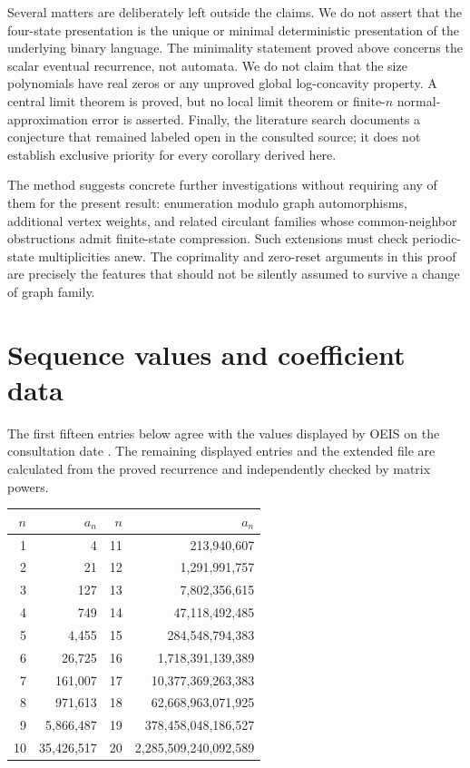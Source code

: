 \documentclass[11pt,a4paper]{article}
\theoremstyle{definition}
\begin{document}
Several matters are deliberately left outside the claims. We do not assert
that the four-state presentation is the unique or minimal deterministic
presentation of the underlying binary language. The minimality statement
proved above concerns the scalar eventual recurrence, not automata. We do
not claim that the size polynomials have real zeros or any unproved global
log-concavity property. A central limit theorem is proved, but no local limit
theorem or finite-$n$ normal-approximation error is asserted. Finally, the
literature search documents a conjecture that remained labeled open in the
consulted source; it does not establish exclusive priority for every
corollary derived here.

The method suggests concrete further investigations without requiring any
of them for the present result: enumeration modulo graph automorphisms,
additional vertex weights, and related circulant families whose
common-neighbor obstructions admit finite-state compression. Such extensions
must check periodic-state multiplicities anew. The coprimality and zero-reset
arguments in this proof are precisely the features that should not be
silently assumed to survive a change of graph family.

\appendix
\section{Sequence values and coefficient data}
\label{app:data}

The first fifteen entries below agree with the values displayed by OEIS on
the consultation date \cite{oeis}. The remaining displayed entries and the
extended file are calculated from the proved recurrence and independently
checked by matrix powers.
\begin{center}
\begin{tabular}{@{}rr@{\qquad}rr@{}}
\toprule
$n$ & $a_n$ & $n$ & $a_n$\\
\midrule
1 & 4 & 11 & 213,940,607 \\
2 & 21 & 12 & 1,291,991,757 \\
3 & 127 & 13 & 7,802,356,615 \\
4 & 749 & 14 & 47,118,492,485 \\
5 & 4,455 & 15 & 284,548,794,383 \\
6 & 26,725 & 16 & 1,718,391,139,389 \\
7 & 161,007 & 17 & 10,377,369,263,383 \\
8 & 971,613 & 18 & 62,668,963,071,925 \\
9 & 5,866,487 & 19 & 378,458,048,186,527 \\
10 & 35,426,517 & 20 & 2,285,509,240,092,589 \\
\bottomrule
\end{tabular}
\end{center}
\end{document}
